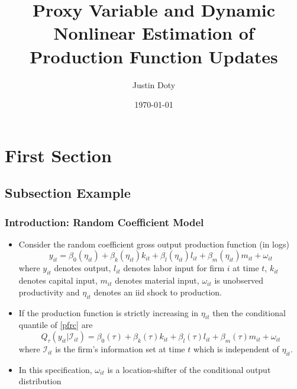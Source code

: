 \documentclass{beamer}
\title[Quantile Production Functions]{Proxy Variable and Dynamic Nonlinear Estimation of Production Function Updates}
\author{Justin Doty} %
\institute[] %
{
\\  
\medskip %
}
\date{\today} %
\begin{document}
\begin{frame}
\titlepage %
\end{frame}


\section{First Section} %

\subsection{Subsection Example} %

\begin{frame}
\frametitle{Introduction: Random Coefficient Model}
\begin{itemize}
\item Consider the random coefficient gross output production function (in logs)
\begin{equation} \label{pfrc}
    y_{it}=\beta_{0}(\eta_{it})+\beta_{k}(\eta_{it})k_{it}+\beta_{l}(\eta_{it})l_{it}+\beta_{m}(\eta_{it})m_{it}+\omega_{it}
\end{equation}
where $y_{it}$ denotes output, $l_{it}$ denotes labor input for firm $i$ at time $t$, $k_{it}$ denotes capital input, $m_{it}$ denotes material input, $\omega_{it}$ is unobserved productivity and $\eta_{it}$ denotes an iid shock to production.
\item If the production function is strictly increasing in $\eta_{it}$ then the conditional quantile of \eqref{pfrc} are
\begin{equation}
Q_{\tau}(y_{it}|\mathcal{I}_{it})=\beta_{0}(\tau)+\beta_{k}(\tau)k_{it}+\beta_{l}(\tau)l_{it}+\beta_{m}(\tau)m_{it}+\omega_{it}
\end{equation}
where $\mathcal{I}_{it}$ is the firm's information set at time $t$ which is independent of $\eta_{it}$.
\item In this specification, $\omega_{it}$ is a location-shifter of the conditional output distribution
\end{itemize}
\end{frame}
\end{document}
